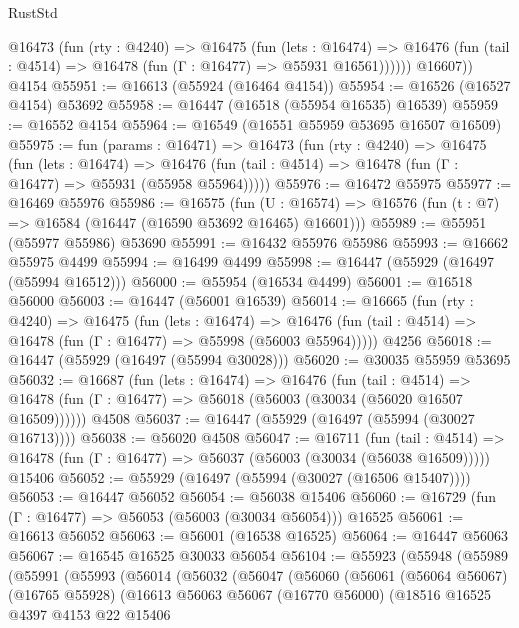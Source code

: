 \begin{lexlean}{RustStd}
\begin{coremodule}
          @16473
            (fun (rty : @4240) =>
            @16475
              (fun (lets : @16474) =>
              @16476 (fun (tail : @4514) => @16478 (fun (Γ : @16477) => @55931 @16561))))))
        @16607))
    @4154
@55951 := @16613 (@55924 (@16464 @4154))
@55954 := @16526 (@16527 @4154) @53692
@55958 := @16447 (@16518 (@55954 @16535) @16539)
@55959 := @16552 @4154
@55964 := @16549 (@16551 @55959 @53695 @16507 @16509)
@55975 := fun (params : @16471) =>
  @16473
    (fun (rty : @4240) =>
    @16475
      (fun (lets : @16474) =>
      @16476 (fun (tail : @4514) => @16478 (fun (Γ : @16477) => @55931 (@55958 @55964)))))
@55976 := @16472 @55975
@55977 := @16469 @55976
@55986 := @16575
    (fun (U : @16574) => @16576 (fun (t : @7) => @16584 (@16447 (@16590 @53692 @16465) @16601)))
@55989 := @55951 (@55977 @55986) @53690
@55991 := @16432 @55976 @55986
@55993 := @16662 @55975 @4499
@55994 := @16499 @4499
@55998 := @16447 (@55929 (@16497 (@55994 @16512)))
@56000 := @55954 (@16534 @4499)
@56001 := @16518 @56000
@56003 := @16447 (@56001 @16539)
@56014 := @16665
    (fun (rty : @4240) =>
    @16475
      (fun (lets : @16474) =>
      @16476 (fun (tail : @4514) => @16478 (fun (Γ : @16477) => @55998 (@56003 @55964)))))
    @4256
@56018 := @16447 (@55929 (@16497 (@55994 @30028)))
@56020 := @30035 @55959 @53695
@56032 := @16687
    (fun (lets : @16474) =>
    @16476
      (fun (tail : @4514) =>
      @16478 (fun (Γ : @16477) => @56018 (@56003 (@30034 (@56020 @16507 @16509))))))
    @4508
@56037 := @16447 (@55929 (@16497 (@55994 (@30027 @16713))))
@56038 := @56020 @4508
@56047 := @16711
    (fun (tail : @4514) => @16478 (fun (Γ : @16477) => @56037 (@56003 (@30034 (@56038 @16509)))))
    @15406
@56052 := @55929 (@16497 (@55994 (@30027 (@16506 @15407))))
@56053 := @16447 @56052
@56054 := @56038 @15406
@56060 := @16729 (fun (Γ : @16477) => @56053 (@56003 (@30034 @56054))) @16525
@56061 := @16613 @56052
@56063 := @56001 (@16538 @16525)
@56064 := @16447 @56063
@56067 := @16545 @16525 @30033 @56054
@56104 := @55923
    (@55948
      (@55989
        (@55991
          (@55993
            (@56014
              (@56032
                (@56047
                  (@56060
                    (@56061
                      (@56064 @56067)
                      (@16765 @55928)
                      (@16613
                        @56063
                        @56067
                        (@16770 @56000)
                        (@18516
                          @16525
                          @4397
                          @4153
                          @22
                          @15406

\end{coremodule}
\end{lexlean}
